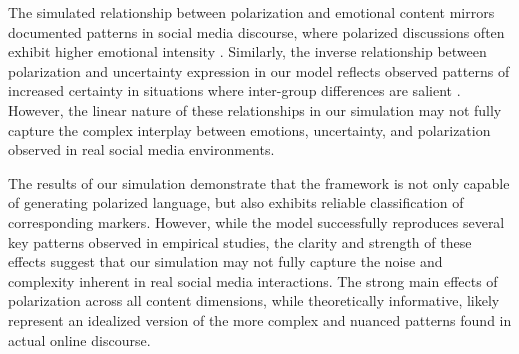 The simulated relationship between polarization and emotional content mirrors documented patterns in social media discourse, where polarized discussions often exhibit higher emotional intensity \citep{asker_thinking_2019,fischer_emotion_2023}. Similarly, the inverse relationship between polarization and uncertainty expression in our model reflects observed patterns of increased certainty in situations where inter-group differences are salient \citep{holtz_intergroup_2001, holtz_relative_2008, winter_toward_2019}. However, the linear nature of these relationships in our simulation may not fully capture the complex interplay between emotions, uncertainty, and polarization observed in real social media environments.

The results of our simulation demonstrate that the framework is not only capable of generating polarized language, but also exhibits reliable classification of corresponding markers. However, while the model successfully reproduces several key patterns observed in empirical studies, the clarity and strength of these effects suggest that our simulation may not fully capture the noise and complexity inherent in real social media interactions. The strong main effects of polarization across all content dimensions, while theoretically informative, likely represent an idealized version of the more complex and nuanced patterns found in actual online discourse.
